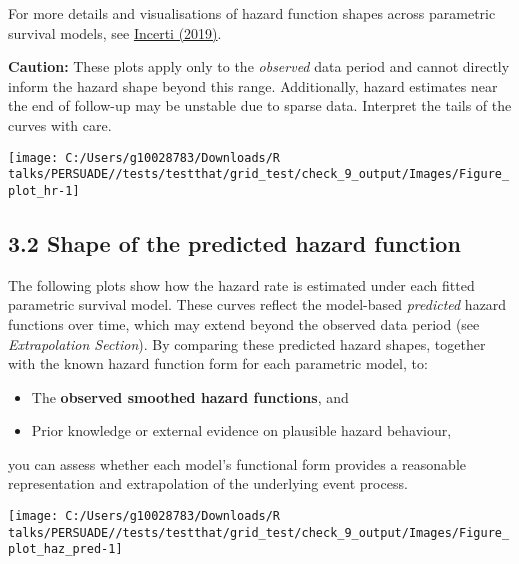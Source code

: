 \documentclass[
]{article}
\providecommand{\tightlist}{%
  \setlength{\itemsep}{0pt}\setlength{\parskip}{0pt}}
\begin{document}
For more details and visualisations of hazard function shapes across
parametric survival models, see
\href{https://devinincerti.com/2019/06/18/parametric_survival.html}{Incerti
(2019)}.

\textbf{Caution:} These plots apply only to the \emph{observed} data
period and cannot directly inform the hazard shape beyond this range.
Additionally, hazard estimates near the end of follow-up may be unstable
due to sparse data. Interpret the tails of the curves with care.

\clearpage

\begin{flushleft}\texttt{[image: C:/Users/g10028783/Downloads/R talks/PERSUADE//tests/testthat/grid\_test/check\_9\_output/Images/Figure\_plot\_hr-1]} \end{flushleft}

\clearpage

\subsection{3.2 Shape of the predicted hazard
function}\label{shape-of-the-predicted-hazard-function}

The following plots show how the hazard rate is estimated under each
fitted parametric survival model. These curves reflect the model-based
\emph{predicted} hazard functions over time, which may extend beyond the
observed data period (see \emph{Extrapolation Section}). By comparing
these predicted hazard shapes, together with the known hazard function
form for each parametric model, to:

\begin{itemize}
\tightlist
\item
  The \textbf{observed smoothed hazard functions}, and\\
\item
  Prior knowledge or external evidence on plausible hazard behaviour,
\end{itemize}

you can assess whether each model's functional form provides a
reasonable representation and extrapolation of the underlying event
process.

\clearpage

\begin{flushleft}\texttt{[image: C:/Users/g10028783/Downloads/R talks/PERSUADE//tests/testthat/grid\_test/check\_9\_output/Images/Figure\_plot\_haz\_pred-1]} \end{flushleft}
\end{document}
